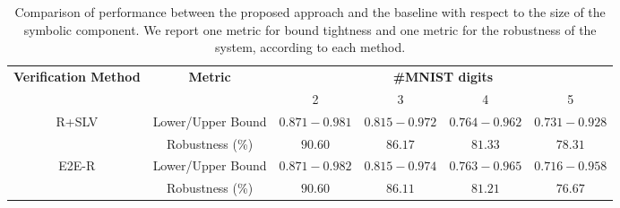 \begin{table*}[t]  
    \renewcommand{\arraystretch}{1.1}
    \centering
    \begin{tabular}{cccccc}
         \hline \hline
         \multirow{2}{*}{\textbf{Verification Method}} & \multirow{2}{*}{\textbf{Metric}} & \multicolumn{4}{c}{\textbf{\#MNIST digits}} \\
         & & 2 & 3 & 4 & 5 \\
         \hline
         \multirow{2}{*}{\textsc{R+SLV}} & Lower/Upper Bound
                                               & $0.871-0.981$ & $0.815-0.972$ & $0.764-0.962$ & $0.731-0.928$ \\
                                               & Robustness (\%)         & $90.60$ & $86.17$ & $81.33$ & $78.31$ \\\hline
         \multirow{2}{*}{\textsc{E2E-R}}  & Lower/Upper Bound
                                               & $0.871-0.982$ & $0.815-0.974$ & $0.763-0.965$ & $0.716-0.958$ \\
                                               & Robustness (\%)         & $90.60$ & $86.11$ & $81.21$ & $76.67$ \\ \hline \hline
    \end{tabular}
    \caption{Comparison of performance between the proposed approach and the baseline with respect to the size of the symbolic component. We report one metric for bound tightness and one metric for the robustness of the system, according to each method.}
    \label{tab:mnist-perf}
\end{table*}

